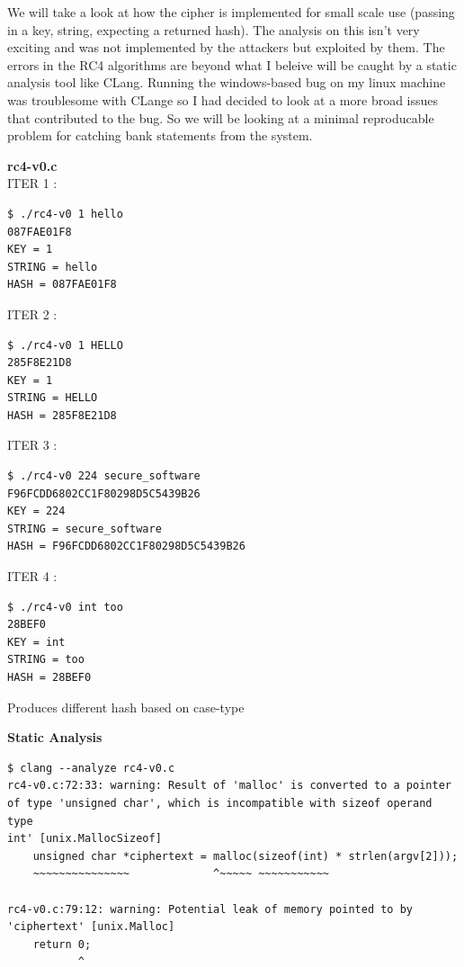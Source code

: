 \documentclass[12pt, letterpaper]{article}
\begin{document}
\begin{sloppypar}
\noindent We will take a look at how the cipher is implemented for small scale use
(passing in a key, string, expecting a returned hash). The analysis on
this isn't very exciting and was not implemented by the attackers but
exploited by them. The errors in the RC4 algorithms are beyond what I
beleive will be caught by a static analysis tool like CLang. Running the
windows-based bug on my linux machine was troublesome with CLange so I
had decided to look at a more broad issues that contributed to the bug.
So we will be looking at a minimal reproducable problem for catching
bank statements from the system.

\noindent \textbf{rc4-v0.c}\\
\noindent ITER 1 :

\begin{verbatim}
$ ./rc4-v0 1 hello
087FAE01F8
KEY = 1
STRING = hello
HASH = 087FAE01F8
\end{verbatim}

\noindent ITER 2 :

\begin{verbatim}
$ ./rc4-v0 1 HELLO
285F8E21D8
KEY = 1
STRING = HELLO
HASH = 285F8E21D8
\end{verbatim}

\noindent ITER 3 :

\begin{verbatim}
$ ./rc4-v0 224 secure_software
F96FCDD6802CC1F80298D5C5439B26
KEY = 224
STRING = secure_software
HASH = F96FCDD6802CC1F80298D5C5439B26
\end{verbatim}

\noindent ITER 4 :

\begin{verbatim}
$ ./rc4-v0 int too
28BEF0
KEY = int
STRING = too
HASH = 28BEF0
\end{verbatim}

\noindent Produces different hash based on case-type

\noindent \textbf{Static Analysis}

\begin{verbatim}
$ clang --analyze rc4-v0.c
rc4-v0.c:72:33: warning: Result of 'malloc' is converted to a pointer
of type 'unsigned char', which is incompatible with sizeof operand type
int' [unix.MallocSizeof]
    unsigned char *ciphertext = malloc(sizeof(int) * strlen(argv[2]));
    ~~~~~~~~~~~~~~~             ^~~~~~ ~~~~~~~~~~~

rc4-v0.c:79:12: warning: Potential leak of memory pointed to by
'ciphertext' [unix.Malloc]
    return 0;
           ^
\end{verbatim}






\end{sloppypar}
\end{document}
